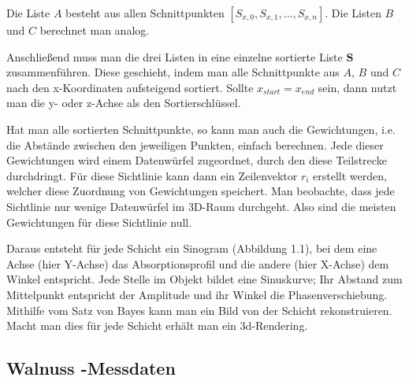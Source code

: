 \documentclass[]{dsadokumentation}
\begin{document}
 Die Liste $A$ besteht aus allen Schnittpunkten $[S_{x,0}, S_{x,1}, ..., S_{x,n}]$. Die Listen $B$ und $C$ berechnet man analog.

Anschließend muss man die drei Listen in eine einzelne sortierte Liste $\mathbf{S}$ zusammenführen. Diese geschieht, indem man alle Schnittpunkte aus $A$, $B$ und $C$ nach den x-Koordinaten aufsteigend sortiert. Sollte $x_{start} = x_{end}$ sein, dann nutzt man die y- oder z-Achse als den Sortierschlüssel.

Hat man alle sortierten Schnittpunkte, so kann man auch die Gewichtungen, i.e. die Abstände zwischen den jeweiligen Punkten, einfach berechnen. Jede dieser Gewichtungen wird einem Datenwürfel zugeordnet, durch den diese Teilstrecke durchdringt. Für diese Sichtlinie kann dann ein Zeilenvektor $r_i$ erstellt werden, welcher diese Zuordnung von Gewichtungen speichert. Man beobachte, dass jede Sichtlinie nur wenige Datenwürfel im 3D-Raum durchgeht. Also sind die meisten Gewichtungen für diese Sichtlinie null.

Daraus entsteht für jede Schicht ein Sinogram (Abbildung 1.1), bei dem eine Achse (hier Y-Achse) das Absorptionsprofil und die andere (hier X-Achse) dem Winkel entspricht. Jede Stelle im Objekt bildet eine Sinuskurve; Ihr Abstand zum Mittelpunkt entspricht der Amplitude und ihr Winkel die Phasenverschiebung. Mithilfe vom Satz von Bayes kann man ein Bild von der Schicht rekonstruieren. Macht man dies für jede Schicht erhält man ein 3d-Rendering.


\subsection{Walnuss -Messdaten}\label{k4.2.ch.walnussct}
\end{document}
